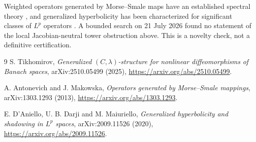 \documentclass[11pt]{article}
\begin{document}
Weighted operators generated by Morse--Smale maps have an established
spectral theory \cite{AntonevichMakowska}, and generalized hyperbolicity has
been characterized for significant classes of $L^p$ operators
\cite{DAnielloDarjiMaiuriello}.  A bounded search on 21 July 2026 found no
statement of the local Jacobian-neutral tower obstruction above.  This is a
novelty check, not a definitive certification.

\begin{thebibliography}{9}
S. Tikhomirov,
\emph{Generalized $(C,\lambda)$-structure for nonlinear diffeomorphisms of
Banach spaces}, arXiv:2510.05499 (2025),
\url{https://arxiv.org/abs/2510.05499}.

A. Antonevich and J. Makowska,
\emph{Operators generated by Morse--Smale mappings},
arXiv:1303.1293 (2013),
\url{https://arxiv.org/abs/1303.1293}.

E. D'Aniello, U. B. Darji and M. Maiuriello,
\emph{Generalized hyperbolicity and shadowing in $L^p$ spaces},
arXiv:2009.11526 (2020),
\url{https://arxiv.org/abs/2009.11526}.
\end{thebibliography}
\end{document}
